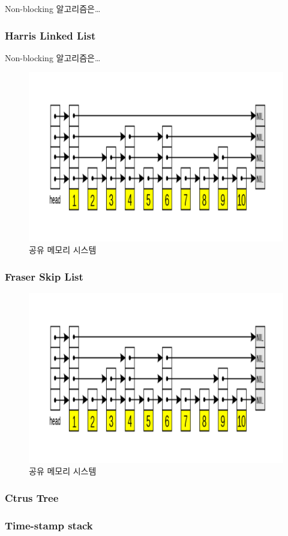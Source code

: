 Non-blocking 알고리즘은\ldots


\subsubsection{Harris Linked List}


Non-blocking 알고리즘은\ldots


\begin{figure}[h]
    \centering
    \includegraphics[width=1\textwidth]{fig/ds/skiplist}
    \caption{공유 메모리 시스템}
  \label{shared_memory}
\end{figure}




\subsubsection{Fraser Skip List}


\begin{figure}[h]
    \centering
    \includegraphics[width=1\textwidth]{fig/ds/skiplist}
    \caption{공유 메모리 시스템}
  \label{shared_memory}
\end{figure}



\subsubsection{Ctrus Tree}


\subsubsection{Time-stamp stack}
